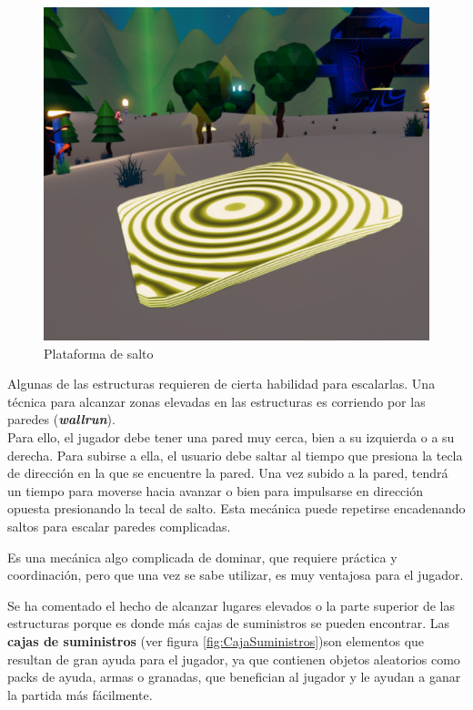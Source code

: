 \begin{figure}[h]
    \centering
    \includegraphics[scale=0.45]{img/bouncePlatform.png}
    \caption{Plataforma de salto}
    \label{fig:PlataformaSalto}
    \end{figure}

Algunas de las estructuras requieren de cierta habilidad para escalarlas. Una técnica para alcanzar zonas elevadas en las estructuras es corriendo por las paredes (\textbf{\textit{wallrun}}).\\
Para ello, el jugador debe tener una pared muy cerca, bien a su izquierda o a su derecha. Para subirse a ella, el usuario debe saltar al tiempo que presiona la tecla de dirección en la que se encuentre la pared. Una vez subido a la pared, tendrá un tiempo para moverse hacia avanzar o bien para impulsarse en dirección opuesta presionando la tecal de salto. Esta mecánica puede repetirse encadenando saltos para escalar paredes complicadas.

Es una mecánica algo complicada de dominar, que requiere práctica y coordinación, pero que una vez se sabe utilizar, es muy ventajosa para el jugador.

Se ha comentado el hecho de alcanzar lugares elevados o la parte superior de las estructuras porque es donde más cajas de suministros se pueden encontrar.
Las \textbf{cajas de suministros} (ver figura \ref{fig:CajaSuministros})son elementos que resultan de gran ayuda para el jugador, ya que contienen objetos aleatorios como packs de ayuda, armas o granadas, que benefician al jugador y le ayudan a ganar la partida más fácilmente.

